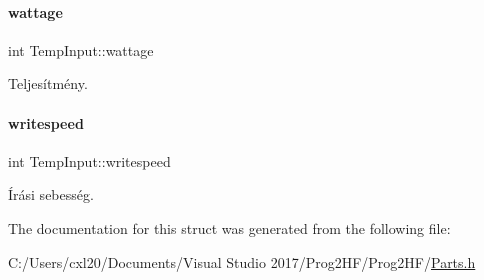 \paragraph{\texorpdfstring{wattage}{wattage}}
{\footnotesize\ttfamily int Temp\+Input\+::wattage}



Teljesítmény. 

\mbox{\label{struct_temp_input_a3d5511c959e7c3531ce3bea3a6248d62}} 
\paragraph{\texorpdfstring{writespeed}{writespeed}}
{\footnotesize\ttfamily int Temp\+Input\+::writespeed}



Írási sebesség. 



The documentation for this struct was generated from the following file\+:\begin{DoxyCompactItemize}
\item 
C\+:/\+Users/cxl20/\+Documents/\+Visual Studio 2017/\+Prog2\+H\+F/\+Prog2\+H\+F/\mbox{\hyperlink{_parts_8h}{Parts.\+h}}\end{DoxyCompactItemize}
